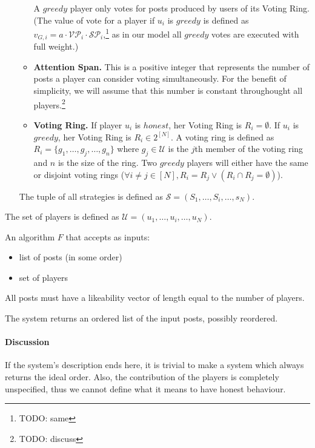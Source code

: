 \begin{definition}[Player]
\begin{itemize}
\begin{itemize}
          A $greedy$ player only votes for posts produced by users of its Voting
          Ring. (The value of vote for a player if $u_i$ is $greedy$ is defined
          as $v_{G,i} = a \cdot \mathcal{VP}_i \cdot
          \mathcal{SP}_i$,\footnote{TODO: same} as in our model all $greedy$
          votes are executed with full weight.)

          \item \textbf{Attention Span.} This is a positive integer that
          represents the number of posts a player can consider voting
          simultaneously. For the benefit of simplicity, we will assume that this
          number is constant throughought all players.\footnote{TODO: discuss}

          \item \textbf{Voting Ring.}  If player $u_i$ is $honest$, her Voting
          Ring is $R_i = \emptyset$. If $u_i$ is $greedy$, her Voting Ring is $R_i
          \in 2^{\left[N\right]}$. A voting ring is defined as $R_i = \lbrace
          g_1, \dots, g_j, \dots, g_n \rbrace$ where $g_j \in \mathcal{U}$ is the
          $j$th member of the voting ring and $n$ is the size of the ring. Two
          $greedy$ players will either have the same or disjoint voting rings
          ($\forall i \neq j \in \left[N\right], R_i = R_j \vee \left(R_i \cap
          R_j = \emptyset\right)$).
        \end{itemize}
        The tuple of all strategies is defined as $\mathcal{S} = (S_1, \dots,
        S_i, \dots, s_N)$.
      \end{itemize}
      The set of players is defined as $\mathcal{U} = \left(u_1, \dots, u_i,
      \dots, u_N\right)$.
    \end{definition}

    \begin{definition}
      An algorithm $F$ that accepts as inputs:
      \begin{itemize}
        \item list of posts (in some order)
        \item set of players
      \end{itemize}
      All posts must have a likeability vector of length equal to the number of
      players.

      The system returns an ordered list of the input posts, possibly reordered.
    \end{definition}

    \paragraph{Discussion}
      If the system's description ends here, it is trivial to make a system
      which always returns the ideal order. Also, the contribution of the
      players is completely unspecified, thus we cannot define what it means to
      have honest behaviour.

